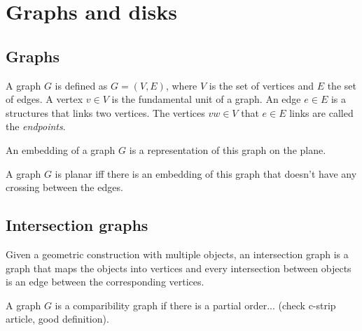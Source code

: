 \section{Graphs and disks}


\subsection{Graphs}

A graph $G$ is defined as $G = (V,E)$, where $V$ is the set of vertices and $E$ the set of edges. A vertex $v \in V$ is the fundamental unit of a graph. An edge $e \in E$ is a structures that links two vertices. The vertices $vw \in V$ that $e \in E$ links are called the \textit{endpoints}.

\begin{defn}
  An embedding of a graph $G$ is a representation of this graph on the plane.
\end{defn}

\begin{defn}
  A graph $G$ is planar iff there is an embedding of this graph that doesn't have any crossing between the edges.
\end{defn}


\subsection{Intersection graphs}

%

Given a geometric construction with multiple objects, an intersection graph is a graph that maps the objects into vertices and every intersection between objects is an edge between the corresponding vertices.

\begin{defn}
  A graph $G$ is a comparibility graph if there is a partial order... (check c-strip article, good definition).
\end{defn}


